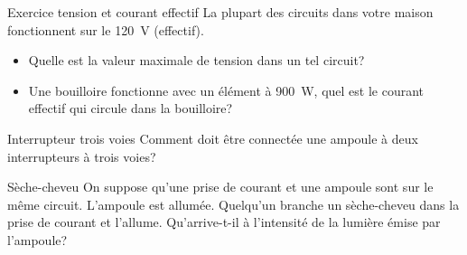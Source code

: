 \documentclass{beamer}
\begin{document}
\begin{frame}{Exercice tension et courant effectif}
La plupart des circuits dans votre maison fonctionnent sur le \SI{120}{\volt}
(effectif).
\begin{itemize}
  \item Quelle est la valeur maximale de tension dans un tel circuit?
  \item Une bouilloire fonctionne avec un élément à \SI{900}{W}, quel est le
    courant effectif qui circule dans la bouilloire?
\end{itemize}
\end{frame}


\begin{frame}{Interrupteur trois voies}
Comment doit être connectée une ampoule à deux interrupteurs à trois voies?
\end{frame}


\begin{frame}{Sèche-cheveu}
On suppose qu'une prise de courant et une ampoule sont sur le même circuit.
L'ampoule est allumée. Quelqu'un branche un sèche-cheveu dans la prise de
courant et l'allume. Qu'arrive-t-il à l'intensité de la lumière émise par
l'ampoule?
\end{frame}
\end{document}
